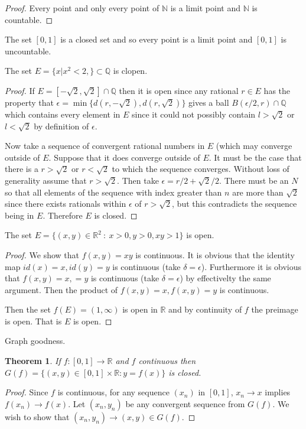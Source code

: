 \documentclass[letter]{article}
\newtheorem{theorem}{Theorem}
\newenvironment{menumerate}{%
  \edef\backupindent{\the\parindent}%
  \enumerate%
  \setlength{\parindent}{\backupindent}%
}{\endenumerate}
\begin{document}
\begin{menumerate}
\begin{proof}
	   Every point and only every point of $\mathbb{N}$ is a limit point and $\mathbb{N}$ is countable.
	   \end{proof}

	   The set $[0,1]$ is a closed set and so every point is a limit point and $[0,1]$ is uncountable.

		\item The set $E = \{x | x^2 < 2,\} \subset \mathbb{Q}$ is clopen.
		\begin{proof}
			If $E = [-\sqrt{2}, \sqrt{2}] \cap \mathbb{Q}$ then it is open since any rational $r \in E$ has the property that $\epsilon = \min\{d(r, -\sqrt{2}),d(r, \sqrt{2})\}$ gives a ball $B(\epsilon/2, r) \cap \mathbb{Q}$ which contains every element in $E$ since it could not possibly contain $l > \sqrt{2}$ or $l <\sqrt{2}$ by definition of $\epsilon.$ 

			Now take a sequence of convergent rational numbers in $E$ (which may converge outside of $E$. Suppose that it does converge outside of $E$. It must be the case that there is a $r > \sqrt{2}$ or $r < \sqrt{2}$ to which the sequence converges. Without loss of generality assume that $r > \sqrt{2}.$ Then take $\epsilon = r/2 + \sqrt{2}/2.$ There must be an $N$ so that all elements of the sequence with index greater than $n$ are more than $\sqrt{2}$ since there exists rationals within $\epsilon$ of $r > \sqrt{2}$, but this contradicts the sequence being in $E.$ Therefore $E$ is closed.
	   	\end{proof}

	   	\item The set $E = \{(x,y) \in \mathbb{R}^2 \ :\ x>0, y>0, xy > 1\}$ is open.
	   	\begin{proof}
	   		We show that $f(x,y) = xy$ is continuous. It is obvious that the identity map $id(x) =x, id(y) = y$ is continuous (take $\delta = \epsilon$). Furthermore it is obvious that $f(x,y) = x,=y$ is continuous (take $\delta = \epsilon$) by effectivelty the same argument. 
	   		Then the product of $f(x,y) =x, f(x,y) = y$ is continuous.

	   		Then the set $f(E) = (1, \infty)$ is open in $\mathbb{R}$ and by continuity of $f$ the preimage is open. That is $E$ is open.
	   	\end{proof}

	   	\item Graph goodness.
	   	\begin{theorem}
			If $f:[0,1] \to \mathbb{R}$ and $f$ continuous then $G(f) = \{(x,y) \in [0,1] \times \mathbb{R} : y = f(x)\}$ is closed.   	
	   	\end{theorem}
	   	\begin{proof}
	   		Since $f$ is continuous, for any sequence $(x_n)$ in $[0,1]$, $x_n \to x$ implies $f(x_n) \to f(x).$ Let $(x_n, y_n)$ be any convergent sequence from $G(f).$ We wish to show that $(x_n, y_n) \to (x,y) \in G(f).$


\end{proof}
\end{menumerate}
\end{document}

